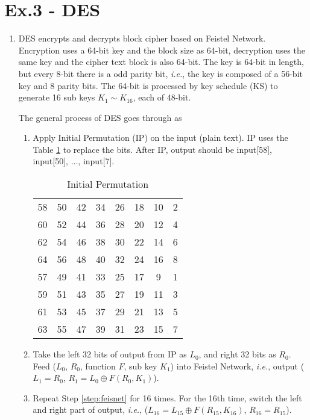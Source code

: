 \documentclass[12pt]{article}
\begin{document}
\section*{Ex.3 - DES}

\begin{enumerate}
	\item
		DES encrypts and decrypts block cipher based on Feistel Network. Encryption uses a 64-bit key and the block size as 64-bit, decryption uses the same key and the cipher text block is also 64-bit. The key is 64-bit in length, but every 8-bit there is a odd parity bit, \textit{i.e.}, the key is composed of a 56-bit key and 8 parity bits. The 64-bit is processed by key schedule (KS) to generate 16 sub keys $K_1 \sim K_{16}$, each of 48-bit.

		The general process of DES goes through as
		\begin{enumerate}
			\item
				Apply Initial Permutation (IP) on the input (plain text). IP uses the Table \ref{tab:ip} to replace the bits. After IP, output should be input[58], input[50], $\ldots$, input[7].
				\begin{table}[hbtp]
					\centering
					\begin{tabular}{cccccccc}
						58 & 50 & 42 & 34 & 26 & 18 & 10 & 2\\
						60 & 52 & 44 & 36 & 28 & 20 & 12 & 4\\
						62 & 54 & 46 & 38 & 30 & 22 & 14 & 6\\
						64 & 56 & 48 & 40 & 32 & 24 & 16 & 8\\
						57 & 49 & 41 & 33 & 25 & 17 &  9 & 1\\
						59 & 51 & 43 & 35 & 27 & 19 & 11 & 3\\
						61 & 53 & 45 & 37 & 29 & 21 & 13 & 5\\
						63 & 55 & 47 & 39 & 31 & 23 & 15 & 7\\
					\end{tabular}
					\caption{Initial Permutation}
					\label{tab:ip}
				\end{table}
			\item
				\label{step:feisnet}
				Take the left 32 bits of output from IP as $L_0$, and right 32 bits as $R_0$. Feed ($L_0$, $R_0$, function $F$, sub key $K_1$) into Feistel Network, \textit{i.e.}, output ($L_1=R_0$, $R_1=L_0 \oplus F(R_0,K_1)$).
			\item
				Repeat Step \ref{step:feisnet} for 16 times. For the 16th time, switch the left and right part of output, \textit{i.e.}, ($L_{16}=L_{15} \oplus F(R_{15},K_{16})$, $R_{16}=R_{15}$).

\end{enumerate}
\end{enumerate}
\end{document}
